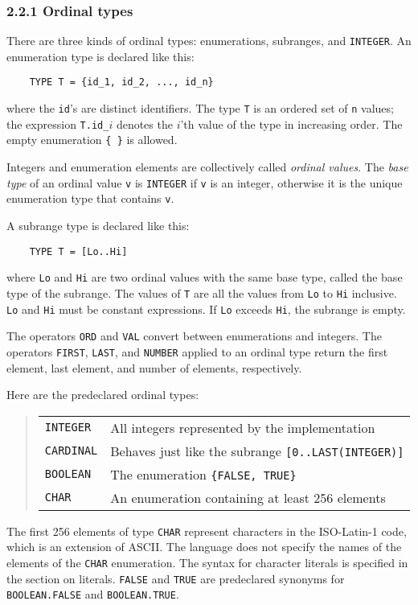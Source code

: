 \documentclass[10pt]{article}
\begin{document}
\subsubsection*{2.2.1 Ordinal types}

There are three kinds of ordinal types: enumerations, subranges, and
\verb|INTEGER|.  An enumeration type is declared like this:
\begin{verbatim}
    TYPE T = {id_1, id_2, ..., id_n}
\end{verbatim}
where the \verb|id|'s are distinct identifiers.  The type \verb|T| is an
ordered set of \verb|n| values; the expression \verb|T.id_|$i$ denotes the
$i$'th value of the type in increasing order.  The empty enumeration
\verb|{ }| is allowed.

Integers and enumeration elements are collectively called \emph{ordinal
  values}.  The \emph{base type} of an ordinal value \verb|v| is
\verb|INTEGER| if \verb|v| is an integer, otherwise it is the unique
enumeration type that contains \verb|v|.

A subrange type is declared like this:
\begin{verbatim}
    TYPE T = [Lo..Hi]
\end{verbatim}
where \verb|Lo| and \verb|Hi| are two ordinal values with the same base type,
called the base type of the subrange.  The values of \verb|T| are all the
values from \verb|Lo| to \verb|Hi| inclusive.  \verb|Lo| and \verb|Hi| must be
constant expressions.  If \verb|Lo| exceeds \verb|Hi|, the subrange is empty.

The operators \verb|ORD| and \verb|VAL| convert between enumerations and
integers.  The operators \verb|FIRST|, \verb|LAST|, and \verb|NUMBER| applied
to an ordinal type return the first element, last element, and number of
elements, respectively.

Here are the predeclared ordinal types:
\begin{quote}
  \begin{tabular}{ll}
    \verb|INTEGER|  & All integers represented by the implementation \\
    \verb|CARDINAL| & Behaves just like the subrange \verb|[0..LAST(INTEGER)]|
    \\
    \verb|BOOLEAN|  & The enumeration \verb|{FALSE, TRUE}| \\
    \verb|CHAR|     & An enumeration containing at least 256 elements \\
  \end{tabular}
\end{quote}
The first 256 elements of type \verb|CHAR| represent characters in the
ISO-Latin-1 code, which is an extension of ASCII.  The language does not
specify the names of the elements of the \verb|CHAR| enumeration.  The syntax
for character literals is specified in the section on literals.  \verb|FALSE|
and \verb|TRUE| are predeclared synonyms for \verb|BOOLEAN.FALSE| and
\verb|BOOLEAN.TRUE|.
\end{document}
